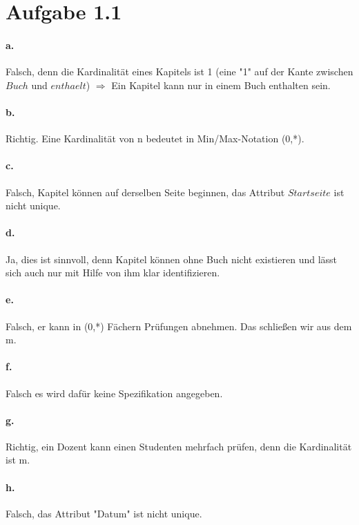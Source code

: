 \documentclass{article}
\begin{document}
	
	
	
	
	\section*{Aufgabe 1.1}
		\paragraph*{a.} Falsch, denn die Kardinalität eines Kapitels ist 1 (eine "1" auf der Kante zwischen $Buch$ und $enthaelt$) $\Rightarrow$ Ein Kapitel kann nur in einem Buch enthalten sein.
		
		\paragraph*{b.} Richtig. Eine Kardinalität von n bedeutet in Min/Max-Notation (0,*).
		
		\paragraph*{c.} Falsch, Kapitel können auf derselben Seite beginnen, das Attribut $Startseite$ ist nicht unique.
		
		\paragraph*{d.} Ja, dies ist sinnvoll, denn Kapitel können ohne Buch nicht existieren und lässt sich auch nur mit Hilfe von ihm klar identifizieren.
		
		\paragraph*{e.}Falsch, er kann in (0,*) Fächern Prüfungen abnehmen. Das schließen wir aus dem m.
		
		\paragraph*{f.}Falsch es wird dafür keine Spezifikation angegeben.
		
		\paragraph*{g.}Richtig, ein Dozent kann einen Studenten mehrfach prüfen, denn die Kardinalität ist m. 
		
		\paragraph*{h.}Falsch, das Attribut "Datum" ist nicht unique.
		
\end{document}
